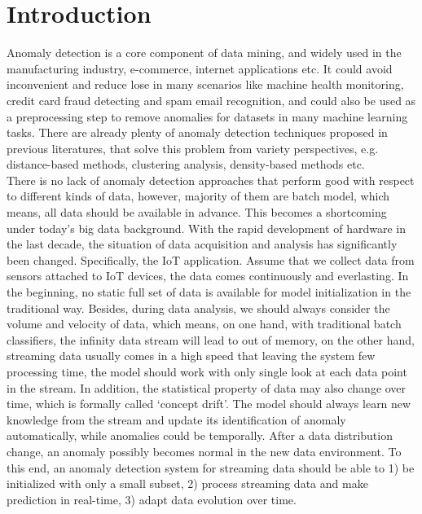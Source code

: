 \chapter{Introduction}
\label{chap:Introduction}

Anomaly detection is a core component of data mining, and widely used in the manufacturing industry, e-commerce, internet applications etc. It could avoid inconvenient and reduce lose in many scenarios like machine health monitoring, credit card fraud detecting and spam email recognition, and could also be used as a preprocessing step to remove anomalies for datasets in many machine learning tasks. There are already plenty of anomaly detection techniques proposed in previous literatures, that solve this problem from variety perspectives, e.g. distance-based methods, clustering analysis, density-based methods etc.\\

There is no lack of anomaly detection approaches that perform good with respect to different kinds of data, however, majority of them are batch model, which means, all data should be available in advance. This becomes a shortcoming under today’s big data background. With the rapid development of hardware in the last decade, the situation of data acquisition and analysis has significantly been changed. Specifically, the IoT application. Assume that we collect data from sensors attached to IoT devices, the data comes continuously and everlasting. In the beginning, no static full set of data is available for model initialization in the traditional way. Besides, during data analysis, we should always consider the volume and velocity of data, which means, on one hand, with traditional batch classifiers, the infinity data stream will lead to out of memory, on the other hand, streaming data usually comes in a high speed that leaving the system few processing time, the model should work with only single look at each data point in the stream. In addition, the statistical property of data may also change over time, which is formally called ‘concept drift’. The model should always learn new knowledge from the stream and update its identification of anomaly automatically, while anomalies could be temporally. After a data distribution change, an anomaly possibly becomes normal in the new data environment. To this end, an anomaly detection system for streaming data should be able to 1) be initialized with only a small subset, 2) process streaming data and make prediction in real-time, 3) adapt data evolution over time.\\


